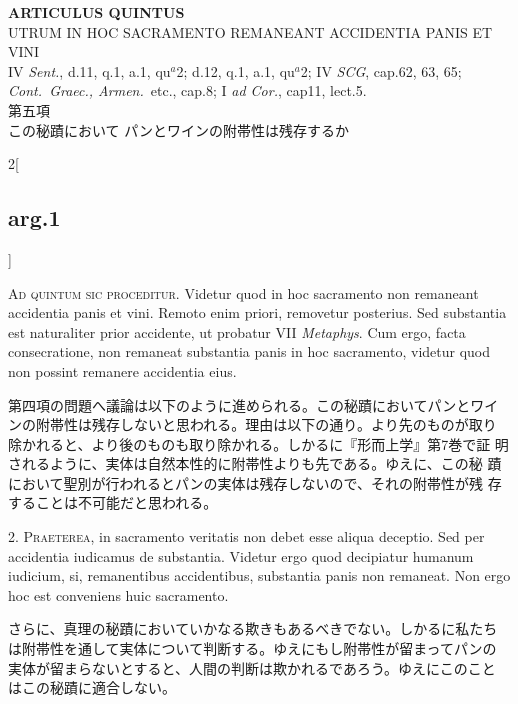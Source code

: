 \documentclass[paper=a4paper,fontsize=10pt,jafontsize=9pt,titlepage]{jlreq}
\begin{document}
\begin{center}
{\Large {\bfseries ARTICULUS QUINTUS}}\\ {\large UTRUM IN HOC SACRAMENTO
REMANEANT ACCIDENTIA PANIS ET VINI}\\ {\footnotesize IV {\itshape
Sent.}, d.11, q.1, a.1, qu$^a$2; d.12, q.1, a.1, qu$^a$2; IV {\itshape
SCG}, cap.62, 63, 65; \\{\itshape Cont.~Graec., Armen.}~etc., cap.8; I
{\itshape ad Cor.}, cap11, lect.5.}\\ {\Large 第五項\\この秘蹟において
パンとワインの附帯性は残存するか}
\end{center}

\begin{paracol}{2}[\subsection{arg.1}]

{\scshape Ad quintum sic proceditur}. Videtur quod in hoc sacramento
non remaneant accidentia panis et vini. Remoto enim priori, removetur
posterius. Sed substantia est naturaliter prior accidente, ut probatur
VII {\itshape Metaphys}. Cum ergo, facta consecratione, non remaneat
substantia panis in hoc sacramento, videtur quod non possint remanere
accidentia eius.

\switchcolumn

第四項の問題へ議論は以下のように進められる。この秘蹟においてパンとワイ
ンの附帯性は残存しないと思われる。理由は以下の通り。より先のものが取り
除かれると、より後のものも取り除かれる。しかるに『形而上学』第7巻で証
明されるように、実体は自然本性的に附帯性よりも先である。ゆえに、この秘
蹟において聖別が行われるとパンの実体は残存しないので、それの附帯性が残
存することは不可能だと思われる。


2. {\scshape Praeterea}, in sacramento veritatis non debet esse aliqua
deceptio. Sed per accidentia iudicamus de substantia. Videtur ergo
quod decipiatur humanum iudicium, si, remanentibus accidentibus,
substantia panis non remaneat. Non ergo hoc est conveniens huic
sacramento.

\switchcolumn

さらに、真理の秘蹟においていかなる欺きもあるべきでない。しかるに私たち
は附帯性を通して実体について判断する。ゆえにもし附帯性が留まってパンの
実体が留まらないとすると、人間の判断は欺かれるであろう。ゆえにこのこと
はこの秘蹟に適合しない。


\end{paracol}
\end{document}
